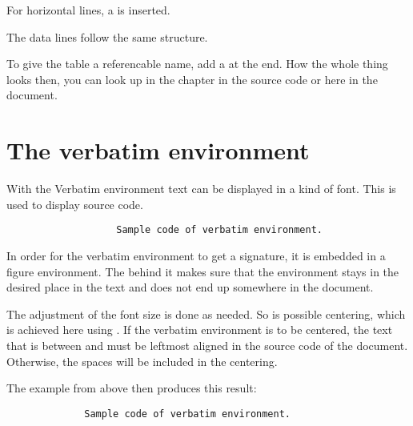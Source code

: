 For horizontal lines, a  is inserted.
\bigbreak

The data lines follow the same structure.
\bigbreak

To give the table a referencable name, add a
 at the end. How
the whole thing looks then, you can look up in the chapter
 in the source code or here in the document.

\section{The verbatim environment}

With the Verbatim environment text can be displayed in a kind of
 font. This is used to display source code.

\begin{figure}[H]
    \centering
    \begin{verbbox}
\begin{figure}[H]
    \small
    \centering
    \begin{BVerbatim}
        Sample code of verbatim environment.
    \end{BVerbatim}
\end{figure}
    \end{verbbox}
    \theverbbox
\end{figure}

In order for the verbatim environment to get a signature, it is embedded in a
figure environment. The \tsFontCode{[H]} behind it makes sure that the
environment stays in the desired place in the text and does not end up
somewhere in the document.
\bigbreak

The adjustment of the font size is done as needed. So is possible centering,
which is achieved here using .
 If the verbatim environment is to be centered, the text that
is between  and
 must be leftmost aligned in the
source code of the document. Otherwise, the spaces will be included in the
centering.
\bigbreak

The example from above then produces this result:

\begin{figure}[H]
    \small
    \centering
    \begin{BVerbatim}
        Sample code of verbatim environment.
    \end{BVerbatim}
\end{figure}
